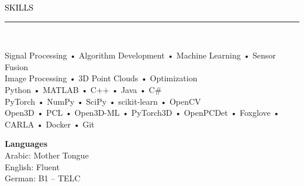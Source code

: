 {\setmainfont{Rubik Medium}\fontsize{11}{14}\selectfont\textcolor{black}{SKILLS}}
\\[-4pt]
\textcolor{black}{\rule{\textwidth}{2pt}}\\[-4pt]

\begin{minipage}[t]{0.68\textwidth}
{\setmainfont{Rubik Light}\fontsize{10}{13}\selectfont\color{gray}
Signal Processing • Algorithm Development • Machine Learning • Sensor Fusion\\
Image Processing • 3D Point Clouds • Optimization \\[4pt]
Python • MATLAB • C++ • Java • C\#\\
PyTorch • NumPy • SciPy • scikit-learn • OpenCV\\
Open3D • PCL • Open3D-ML • PyTorch3D • OpenPCDet • Foxglove • CARLA • Docker • Git
}
\end{minipage}
\hfill
\begin{minipage}[t]{0.27\textwidth}
{\setmainfont{Rubik Light}\fontsize{10}{13}\selectfont\color{gray}
\textbf{Languages}\\[4pt]
Arabic: Mother Tongue\\
English: Fluent\\
German: B1 – TELC\\
}
\end{minipage}